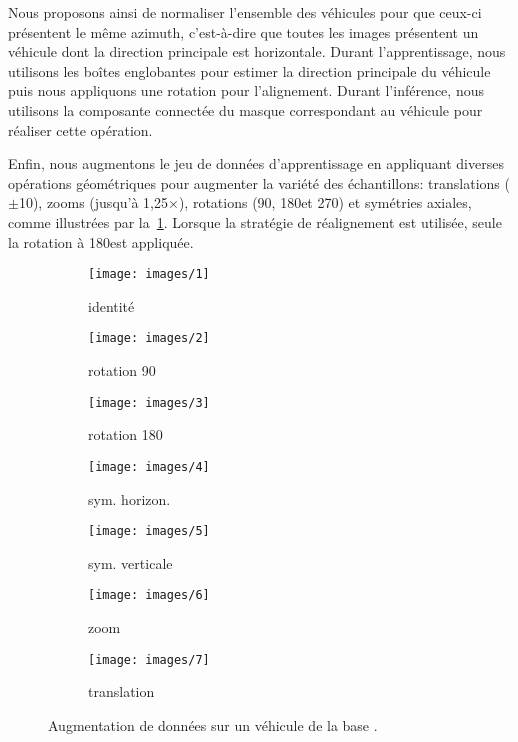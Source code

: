 Nous proposons ainsi de normaliser l'ensemble des véhicules pour que ceux-ci présentent le même azimuth, c'est-à-dire que toutes les images présentent un véhicule dont la direction principale est horizontale. Durant l'apprentissage, nous utilisons les boîtes englobantes pour estimer la direction principale du véhicule puis nous appliquons une rotation pour l'alignement. Durant l'inférence, nous utilisons la composante connectée du masque correspondant au véhicule pour réaliser cette opération.

Enfin, nous augmentons le jeu de données d'apprentissage en appliquant diverses opérations géométriques pour augmenter la variété des échantillons: translations ($\pm$\SI{10}{\px}), zooms (jusqu'à 1,25$\times$), rotations (90\degre, 180\degre et 270\degre) et symétries axiales, comme illustrées par la~\cref{fig:augmented_car}. Lorsque la stratégie de réalignement est utilisée, seule la rotation à 180\degre est appliquée.

\begin{figure}[t]
	\begin{subfigure}{0.142\textwidth}
    	\texttt{[image: images/1]}
        \caption*{identité}
    \end{subfigure}%
    \begin{subfigure}{0.142\textwidth}
    	\texttt{[image: images/2]}
        \caption*{rotation 90\degre}
    \end{subfigure}%
    \begin{subfigure}{0.142\textwidth}
    	\texttt{[image: images/3]}
        \caption*{rotation 180\degre}
    \end{subfigure}%
    \begin{subfigure}{0.142\textwidth}
    	\texttt{[image: images/4]}
        \caption*{sym. horizon.}
    \end{subfigure}%
    \begin{subfigure}{0.142\textwidth}
    	\texttt{[image: images/5]}
        \caption*{sym. verticale}
    \end{subfigure}%
    \begin{subfigure}{0.142\textwidth}
    	\texttt{[image: images/6]}
        \caption*{zoom}
    \end{subfigure}%
    \begin{subfigure}{0.142\textwidth}
    	\texttt{[image: images/7]}
        \caption*{translation}
    \end{subfigure}
    \caption{Augmentation de données sur un véhicule de la base .}
    \label{fig:augmented_car}
\end{figure}

